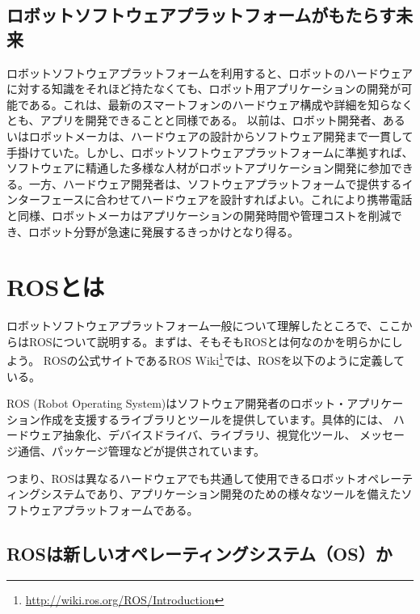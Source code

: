 \subsection{ロボットソフトウェアプラットフォームがもたらす未来}

ロボットソフトウェアプラットフォームを利用すると、ロボットのハードウェアに対する知識をそれほど持たなくても、ロボット用アプリケーションの開発が可能である。これは、最新のスマートフォンのハードウェア構成や詳細を知らなくとも、アプリを開発できることと同様である。
以前は、ロボット開発者、あるいはロボットメーカは、ハードウェアの設計からソフトウェア開発まで一貫して手掛けていた。しかし、ロボットソフトウェアプラットフォームに準拠すれば、ソフトウェアに精通した多様な人材がロボットアプリケーション開発に参加できる。一方、ハードウェア開発者は、ソフトウェアプラットフォームで提供するインターフェースに合わせてハードウェアを設計すればよい。これにより携帯電話と同様、ロボットメーカはアプリケーションの開発時間や管理コストを削減でき、ロボット分野が急速に発展するきっかけとなり得る。

\section{ROSとは}

ロボットソフトウェアプラットフォーム一般について理解したところで、ここからはROSについて説明する。まずは、そもそもROSとは何なのかを明らかにしよう。
ROSの公式サイトであるROS Wiki\footnote{\url{http://wiki.ros.org/ROS/Introduction}}では、ROSを以下のように定義している。

ROS (Robot Operating System)はソフトウェア開発者のロボット・アプリケーション作成を支援するライブラリとツールを提供しています。具体的には、 ハードウェア抽象化、デバイスドライバ、ライブラリ、視覚化ツール、 メッセージ通信、パッケージ管理などが提供されています。

つまり、ROSは異なるハードウェアでも共通して使用できるロボットオペレーティングシステムであり、アプリケーション開発のための様々なツールを備えたソフトウェアプラットフォームである。

\subsection{ROSは新しいオペレーティングシステム（OS）か}

